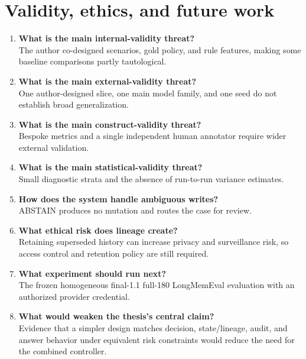 \section{Validity, ethics, and future
work}\label{validity-ethics-and-future-work}

\begin{enumerate}
\def\labelenumi{\arabic{enumi}.}
\setcounter{enumi}{52}
\item
  \textbf{What is the main internal-validity threat?}\\
  The author co-designed scenarios, gold policy, and rule features,
  making some baseline comparisons partly tautological.
\item
  \textbf{What is the main external-validity threat?}\\
  One author-designed slice, one main model family, and one seed do not
  establish broad generalization.
\item
  \textbf{What is the main construct-validity threat?}\\
  Bespoke metrics and a single independent human annotator require wider
  external validation.
\item
  \textbf{What is the main statistical-validity threat?}\\
  Small diagnostic strata and the absence of run-to-run variance
  estimates.
\item
  \textbf{How does the system handle ambiguous writes?}\\
  ABSTAIN produces no mutation and routes the case for review.
\item
  \textbf{What ethical risk does lineage create?}\\
  Retaining superseded history can increase privacy and surveillance
  risk, so access control and retention policy are still required.
\item
  \textbf{What experiment should run next?}\\
  The frozen homogeneous final-1.1 full-180 LongMemEval evaluation with
  an authorized provider credential.
\item
  \textbf{What would weaken the thesis's central claim?}\\
  Evidence that a simpler design matches decision, state/lineage, audit,
  and answer behavior under equivalent risk constraints would reduce the
  need for the combined controller.
\end{enumerate}
